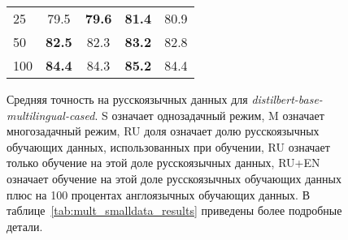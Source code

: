 \begin{figure}[!htbp]
\begin{minipage}{0.45\textwidth}
{{\begin{tabular}[baseline={(0,2.1)}]{|l||c|c|c|c|}
25 & 79.5 & \textbf{79.6} & \textbf{81.4} & 80.9 \\ 
50 & \textbf{82.5} & 82.3 & \textbf{83.2} & 82.8 \\ 
100 & \textbf{84.4} & 84.3 & \textbf{85.2} & 84.4 \\ \hline
\end{tabular}}
}
\end{minipage}
\caption{Средняя точность на русскоязычных данных для \textit{distilbert-base-multilingual-cased}. S означает однозадачный режим, M означает многозадачный режим, RU доля означает долю русскоязычных обучающих данных, использованных при обучении, RU означает только обучение на этой доле русскоязычных данных, RU+EN означает обучение на этой доле русскоязычных обучающих данных плюс на 100 процентах англоязычных обучающих данных. В таблице~\ref{tab:mult_smalldata_results} приведены более подробные детали.}
\label{fig:tr-ag:ru_dialog_part}
\end{figure}
%

